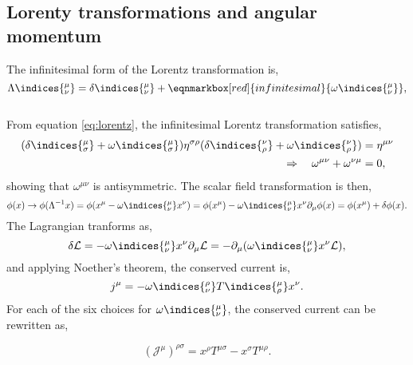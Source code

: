 \subsection{Lorenty transformations and angular momentum}
The infinitesimal form of the Lorentz transformation is,
\begin{equation}
  \Lambda\indices{^\mu_\nu} = \delta\indices{^\mu_\nu} + \eqnmarkbox[red]{infinitesimal}{\omega\indices{^\mu_\nu}},
\end{equation}
\\
From equation \eqref{eq:lorentz}, the infinitesimal Lorentz transformation satisfies,
\begin{equation}
  \begin{aligned}
    (\delta\indices{^\mu_\sigma} + \omega\indices{^\mu_\sigma})\eta^{\sigma\rho}(\delta\indices{^\nu_\rho} + \omega\indices{^\nu_\rho}) &= \eta^{\mu\nu}\\
    \Rightarrow \quad \omega^{\mu\nu} + \omega^{\nu\mu} &= 0,
  \end{aligned}
\end{equation}
showing that $\omega^{\mu\nu}$ is antisymmetric. The scalar field transformation is then, 
\begin{equation}
  \phi(x) \rightarrow \phi(\Lambda^{-1}x) = \phi(x^\mu - \omega\indices{^\mu_\nu} x^\nu) = \phi(x^\mu) - \omega\indices{^\mu_\nu}x^\nu\partial_\mu\phi(x) = \phi(x^\mu) +\delta\phi(x).
\end{equation}
The Lagrangian tranforms as,
\begin{equation}
  \delta\mathcal{L} = -\omega\indices{^\mu_\nu}x^\nu\partial_\mu\mathcal{L} = -\partial_\mu(\omega\indices{^\mu_\nu}x^\nu\mathcal{L}),
\end{equation}
and applying Noether's theorem, the conserved current is, 
\begin{equation}
  j^\mu = -\omega\indices{^\rho_\nu} T\indices{^\mu_\rho}x^\nu.
\end{equation}
For each of the six choices for $\omega\indices{^\mu_\nu}$, the conserved current can be rewritten as, 
\begin{definition}
  \begin{equation}
    (\mathcal{J}^\mu)^{\rho\sigma} = x^\rho T^{\mu\sigma} - x^\sigma T^{\mu\rho}. 
  \end{equation}
  \vspace{-0.5cm}
\end{definition}
